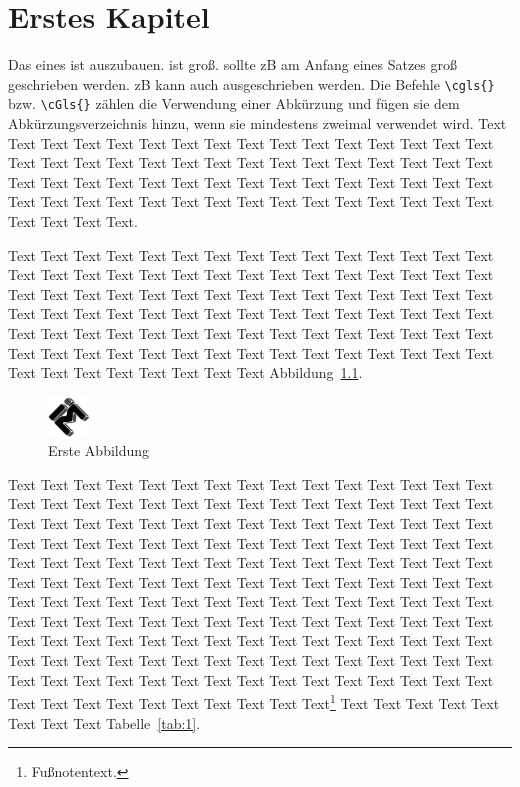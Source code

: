 \chapter{Erstes Kapitel}

Das  eines  ist auszubauen.  ist groß.  sollte \acrshort{zB} am Anfang eines Satzes groß geschrieben werden. \glqq \Acrlong{zB}\grqq\xspace kann auch ausgeschrieben werden. Die Befehle \verb|\cgls{}| bzw. \verb|\cGls{}| zählen die Verwendung einer Abkürzung und fügen sie dem Abkürzungsverzeichnis hinzu, wenn sie mindestens zweimal verwendet wird. Text Text Text Text Text Text Text Text Text Text Text Text Text Text Text Text Text Text Text Text Text Text Text Text Text Text Text Text Text Text Text Text Text Text Text Text Text Text Text Text Text Text Text Text Text Text Text Text Text Text  Text  Text  Text  Text Text Text Text Text Text Text Text Text Text Text Text.

Text  Text Text Text Text Text Text Text Text Text Text Text Text Text Text Text Text Text Text Text Text Text Text Text Text Text Text Text Text Text Text Text Text Text Text Text Text Text Text Text Text Text Text Text Text Text Text Text Text Text Text Text Text Text Text Text Text Text Text Text Text Text Text Text Text Text Text Text Text Text Text Text Text Text Text Text Text Text Text Text Text Text Text Text Text Text Text Text Text Text Text Text Text Text Text Text Text Text Abbildung~\ref{fig:1}.%

\begin{figure}[ht]
    \centering
    \includegraphics[width=0.1\textwidth]{./pictures/IM-Logo}
    \caption[Erste Abbildung]{Erste Abbildung\footnotemark}\label{fig:1}
\end{figure}

Text Text Text Text Text Text Text Text Text Text Text Text Text Text Text Text Text Text Text Text Text Text Text Text Text Text Text Text Text Text Text Text Text Text Text Text Text Text Text Text Text Text Text Text Text Text Text Text Text Text Text Text Text Text Text Text Text Text Text Text Text Text Text Text Text Text Text Text Text Text Text Text Text Text Text Text Text Text Text Text Text Text Text Text Text Text Text Text Text Text Text Text Text Text Text Text Text Text Text Text Text Text Text Text Text Text Text Text Text Text Text  Text Text Text Text Text Text Text Text Text Text Text Text Text Text Text Text Text Text Text Text Text Text Text Text Text Text Text Text Text Text Text Text Text Text Text Text Text Text Text Text Text Text Text Text Text Text Text Text Text Text Text Text Text Text Text Text Text Text Text Text Text Text Text Text\footnote{Fußnotentext.} Text Text Text Text Text Text Text Text Tabelle~\ref{tab:1}.%

